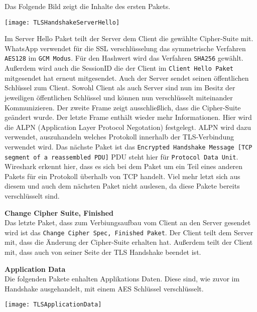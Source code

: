 Das Folgende Bild zeigt die Inhalte des ersten Pakets.

\begin{center}
    \texttt{[image: TLSHandshakeServerHello]}
\end{center}

Im Server Hello Paket teilt der Server dem Client die gewählte Cipher-Suite mit.
WhatsApp verwendet für die SSL verschlüsselung das symmetrische Verfahren 
\texttt{AES128} im \texttt{GCM Modus}. Für den Hashwert wird das Verfahren \texttt{SHA256} gewählt. 
Außerdem wird auch die SessionID die der Client im \texttt{Client Hello Paket} mitgesendet hat erneut mitgesendet. 
Auch der Server sendet seinen öffentlichen Schlüssel zum Client. Sowohl Client als auch Server sind nun 
im Besitz der jeweiligen öffentlichen Schlüssel und können nun verschlüsselt miteinander 
Kommunizieren. Der zweite Frame zeigt ausschließlich, dass die Cipher-Suite geändert wurde. 
Der letzte Frame enthält wieder mehr Informationen. Hier wird die ALPN (Application Layer Protocol Negotation) festgelegt. 
ALPN wird dazu verwendet, auszuhandeln welches Protokoll innerhalb der TLS-Verbindung verwendet wird. 
\cite{ALPN}
Das nächste Paket ist das \texttt{Encrypted Handshake Message [TCP segment of a reassembled PDU]}
PDU steht hier für \texttt{Protocol Data Unit}. Wireshark erkennt hier, dass es sich bei dem Paket um 
ein Teil eines anderen Pakets für ein Protokoll überhalb von TCP handelt. \cite{WSHelp1}
Viel mehr letzt sich aus diesem und auch dem nächsten Paket nicht auslesen, da diese Pakete bereits verschlüsselt sind.


\textbf{Change Cipher Suite, Finished}\\
Das letzte Paket, dass zum Verbiungsaufbau vom Client an den Server gesendet wird ist das \texttt{Change Cipher Spec, Finished Paket}. 
Der Client teilt dem Server mit, dass die Änderung der Cipher-Suite erhalten hat. Außerdem teilt der Client mit, dass
auch von seiner Seite der TLS Handshake beendet ist.

\textbf{Application Data}\\
Die folgenden Pakete enhalten Applikations Daten. Diese sind, wie zuvor im Handshake ausgehandelt, mit einem AES Schlüssel verschlüsselt.
\begin{center}
    \texttt{[image: TLSApplicationData]}
\end{center}
